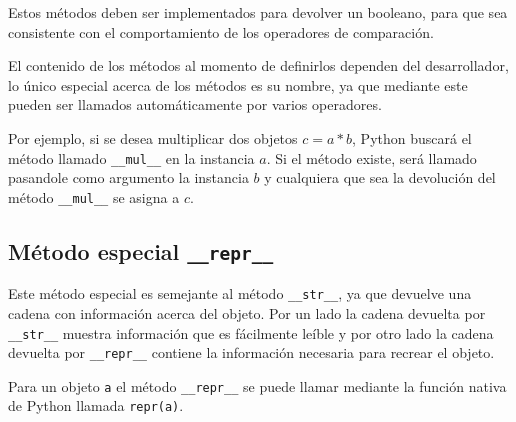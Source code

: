 Estos métodos deben ser implementados para devolver un booleano, para
que sea consistente con el comportamiento de los operadores de
comparación.

El contenido de los métodos al momento de definirlos dependen del
desarrollador, lo único especial acerca de los métodos es su nombre, ya
que mediante este pueden ser llamados automáticamente por varios
operadores.

Por ejemplo, si se desea multiplicar dos objetos \(c = a * b\), Python
buscará el método llamado \texttt{\_\_mul\_\_} en la instancia \(a\). Si
el método existe, será llamado pasandole como argumento la instancia
\(b\) y cualquiera que sea la devolución del método \texttt{\_\_mul\_\_}
se asigna a \(c\).

\subsection{\texorpdfstring{Método especial
\texttt{\_\_repr\_\_}}{Método especial \_\_repr\_\_}}

Este método especial es semejante al método \texttt{\_\_str\_\_}, ya que
devuelve una cadena con información acerca del objeto. Por un lado la
cadena devuelta por \texttt{\_\_str\_\_} muestra información que es
fácilmente leíble y por otro lado la cadena devuelta por
\texttt{\_\_repr\_\_} contiene la información necesaria para recrear el
objeto.

Para un objeto \texttt{a} el método \texttt{\_\_repr\_\_} se puede
llamar mediante la función nativa de Python llamada \texttt{repr(a)}.

